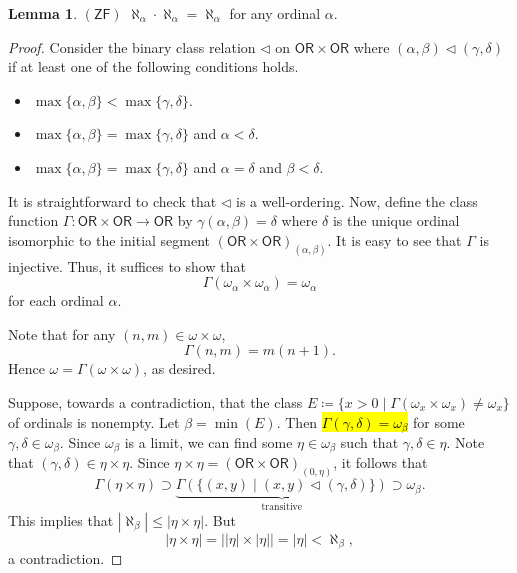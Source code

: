\documentclass[10pt,letterpaper,cm]{nupset}
\theoremstyle{definition}
\theoremstyle{theorem}
\newtheorem{lemma}[definition]{Lemma}
\theoremstyle{remark}
\newcommand{\1}{\mathbf{1}}
\newcommand{\0}{\vec 0}
\newcommand{\zf}{\mathsf{ZF}}
\newcommand{\ord}{\mathsf{OR}}
\begin{document}
\begin{lemma}{$(\zf)$}
$\aleph_{\alpha} \cdot \aleph_{\alpha} = \aleph_{\alpha}$ for any ordinal $\alpha$.
\end{lemma}
\begin{proof} 
Consider the binary class relation $\lhd$ on $\ord \times \ord$ where $\left(\alpha, \beta\right)\lhd \left(\gamma, \delta\right)$ if at least one of the following conditions holds.
\begin{itemize}
\item  $\max\{\alpha, \beta\} <\max\{\gamma, \delta\}$.
\item $\max\{\alpha, \beta\} = \max\{\gamma, \delta\}$ and $\alpha < \delta$.
\item $\max\{\alpha, \beta\} = \max\{\gamma, \delta\}$ and $\alpha =\delta$ and $\beta < \delta$. 
\end{itemize}$ $It is straightforward to check that $\lhd$ is a well-ordering. Now, define the class function $\Gamma : \ord \times \ord \to \ord$ by $\gamma(\alpha, \beta) = \delta$ where $\delta$ is the unique ordinal isomorphic to the initial segment $\left(\ord \times \ord\right)_{(\alpha, \beta)}$. It is easy to see that $\Gamma$ is injective. Thus, it suffices to show that $$\Gamma(\omega_{\alpha} \times \omega_{\alpha}) = \omega_{\alpha}$$ for each ordinal $\alpha$. 

\smallskip

Note that for any $\left(n,m\right) \in \omega \times \omega$, $$ \Gamma(n,m) = 
m(n+1).$$ Hence $\omega =\Gamma(\omega \times \omega)$, as desired.  

\smallskip
 Suppose, towards a contradiction, that the class $E\coloneqq \{x >0 \mid \Gamma(\omega_{x} \times \omega_{x}) \ne \omega_{x}\}$ of ordinals is nonempty. Let $\beta = \min( E )$. Then \hl{$\Gamma(\gamma, \delta) = \omega_{\beta}$} for some $\gamma, \delta \in \omega_{\beta}$. Since $\omega_{\beta}$ is a limit, we can find some $\eta \in \omega_{\beta}$ such that $\gamma,\delta \in \eta$. Note that $\left(\gamma, \delta\right) \in \eta \times \eta$. Since $\eta \times \eta = \left(\ord \times \ord\right)_{(0, \eta)}$, it follows that $$\Gamma(\eta \times \eta) \supset \underbrace{\Gamma(\{\left(x,y\right) \mid \left(x,y\right) \lhd \left(\gamma, \delta\right)\})}_{\text{transitive}} \supset \omega_{\beta}. $$ This implies that $\left\lvert{\aleph_{\beta}}\right\rvert \leq \left\lvert{\eta \times \eta}\right\rvert$. But $$\left\lvert{\eta \times \eta}\right\rvert=  \left\lvert{\left\lvert{\eta}\right\rvert \times \left\lvert{\eta}\right\rvert}\right\rvert = \left\lvert{\eta}\right\rvert < \aleph_{\beta}   ,$$ a contradiction. 
\end{proof}
\end{document}
